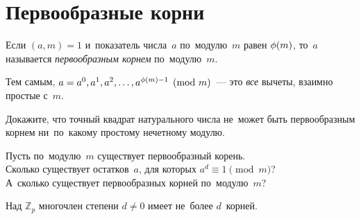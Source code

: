 
\section*{Первообразные корни}


\begingroup \def\eulerphi{\mathrm{\phi}}

Если $(a, m) = 1$ и~показатель числа~$a$ по~модулю~$m$ равен
$\eulerphi(m)$, то~$a$ называется \emph{первообразным корнем}
по~модулю~$m$.

Тем самым, $a = a^0, a^1, a^2, \ldots, a^{\eulerphi(m) - 1} \pmod{m}$~---
это \emph{все} вычеты, взаимно простые с~$m$.

Докажите, что точный квадрат натурального числа не~может быть первообразным
корнем ни~по~какому простому нечетному модулю.

\begin{problems}

\item
Пусть по~модулю~$m$ существует первообразный корень.
\\
\subproblem
Сколько существует остатков~$a$, для которых $a^d \equiv 1 \pmod m$?
\\
\subproblem
А~сколько существует первообразных корней по~модулю~$m$?

\end{problems}

Над $\mathbb{Z}_p$ многочлен степени $d \neq 0$ имеет не~более $d$~корней.

